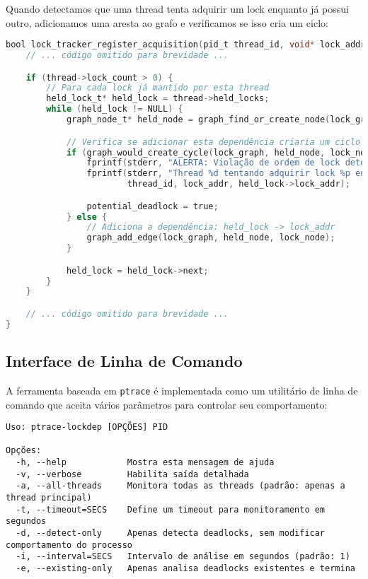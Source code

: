 Quando detectamos que uma thread tenta adquirir um lock enquanto já possui outro, adicionamos uma aresta ao grafo e verificamos se isso cria um ciclo:

\begin{lstlisting}[language=C, caption={Verificação de ciclos no grafo de dependências}]
bool lock_tracker_register_acquisition(pid_t thread_id, void* lock_addr, bool is_recursive) {
    // ... código omitido para brevidade ...

    if (thread->lock_count > 0) {
        // Para cada lock já mantido por esta thread
        held_lock_t* held_lock = thread->held_locks;
        while (held_lock != NULL) {
            graph_node_t* held_node = graph_find_or_create_node(lock_graph, held_lock->lock_addr);

            // Verifica se adicionar esta dependência criaria um ciclo
            if (graph_would_create_cycle(lock_graph, held_node, lock_node)) {
                fprintf(stderr, "ALERTA: Violação de ordem de lock detectada!\n");
                fprintf(stderr, "Thread %d tentando adquirir lock %p enquanto mantém lock %p\n",
                        thread_id, lock_addr, held_lock->lock_addr);

                potential_deadlock = true;
            } else {
                // Adiciona a dependência: held_lock -> lock_addr
                graph_add_edge(lock_graph, held_node, lock_node);
            }

            held_lock = held_lock->next;
        }
    }

    // ... código omitido para brevidade ...
}
\end{lstlisting}

\subsection{Interface de Linha de Comando}

A ferramenta baseada em \texttt{ptrace} é implementada como um utilitário de linha de comando que aceita vários parâmetros para controlar seu comportamento:

\begin{verbatim}
Uso: ptrace-lockdep [OPÇÕES] PID

Opções:
  -h, --help            Mostra esta mensagem de ajuda
  -v, --verbose         Habilita saída detalhada
  -a, --all-threads     Monitora todas as threads (padrão: apenas a thread principal)
  -t, --timeout=SECS    Define um timeout para monitoramento em segundos
  -d, --detect-only     Apenas detecta deadlocks, sem modificar comportamento do processo
  -i, --interval=SECS   Intervalo de análise em segundos (padrão: 1)
  -e, --existing-only   Apenas analisa deadlocks existentes e termina
\end{verbatim}

